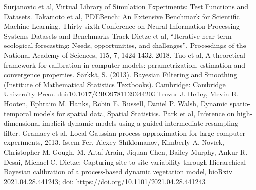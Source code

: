 \documentclass[11pt]{article}
\begin{document}
\begin{thebibliography}{20}
 Surjanovic et al, Virtual Library of Simulation Experiments: Test Functions and Datasets.
 Takamoto et al, PDEBench: An Extensive Benchmark for Scientific Machine Learning. Thirty-sixth Conference on Neural Information Processing Systems Datasets and Benchmarks Track
 Dietze et al, “Iterative near-term ecological forecasting: Needs, opportunities, and challenges”, Proceedings of the National Academy of Sciences, 115, 7, 1424-1432, 2018.
 Tuo et al, A theoretical framework for calibration in computer models: parametrization, estimation and convergence properties. 
 Särkkä, S. (2013). Bayesian Filtering and Smoothing (Institute of Mathematical Statistics Textbooks). Cambridge: Cambridge University Press. doi:10.1017/CBO9781139344203
 Trevor J. Hefley, Mevin B. Hooten, Ephraim M. Hanks, Robin E. Russell, Daniel P. Walsh, Dynamic spatio-temporal models for spatial data, Spatial Statistics.
 Park et al, Inference on high-dimensional implicit dynamic models using a guided intermediate resampling filter.
 Gramacy et al, Local Gaussian process approximation for large computer experiments, 2013.
 Istem Fer, Alexey Shiklomanov, Kimberly A. Novick, Christopher M. Gough, M. Altaf Arain, Jiquan Chen, Bailey Murphy, Ankur R. Desai, Michael C. Dietze: Capturing site-to-site variability through Hierarchical Bayesian calibration of a process-based dynamic vegetation model, bioRxiv 2021.04.28.441243; doi: https://doi.org/10.1101/2021.04.28.441243. 

\end{thebibliography}
\end{document}
